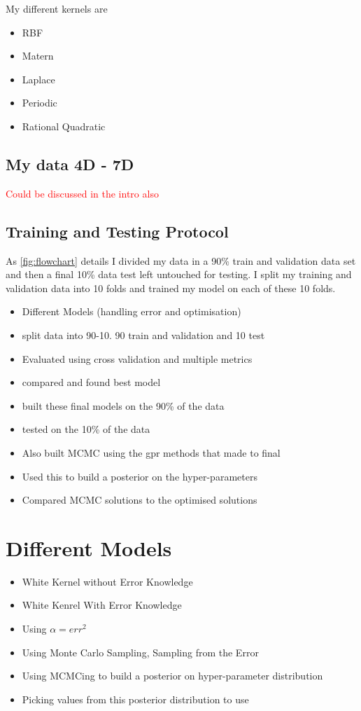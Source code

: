 \documentclass{article}
\begin{document}
My different kernels are
\begin{itemize}
    \item RBF
    \item Matern
    \item Laplace
    \item Periodic
    \item Rational Quadratic
\end{itemize}

\subsection{My data 4D - 7D}
\textcolor{red}{Could be discussed in the intro also}
\subsection{Training and Testing Protocol}
As \ref{fig:flowchart} details I divided my data in a 90\% train and validation data set and then a final 10\% data test left untouched for testing.
I split my training and validation data into 10 folds and trained my model on each of these 10 folds. 



\begin{itemize}
    \item Different Models (handling error and optimisation)
    \item split data into 90-10. 90 train and validation and 10 test
    \item Evaluated using cross validation and multiple metrics
    \item compared and found best model
    \item built these final models on the 90\% of the data
    \item tested on the 10\% of the data
    \item Also built MCMC using the gpr methods that made to final
    \item Used this to build a posterior on the hyper-parameters
    \item Compared MCMC solutions to the optimised solutions
\end{itemize}

\section{Different Models}
\begin{itemize}
    \item White Kernel without Error Knowledge
    \item White Kenrel With Error Knowledge
    \item Using $\alpha = err^2$
    \item Using Monte Carlo Sampling, Sampling from the Error
    \item Using MCMCing to build a posterior on hyper-parameter distribution
    \item Picking values from this posterior distribution to use
\end{itemize}
\end{document}
